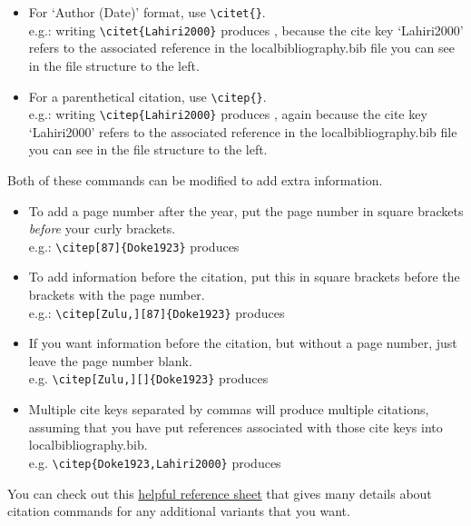 \documentclass[output=paper,colorlinks,citecolor=brown,
]{langscibook}
\begin{document}
 \begin{itemize}
 
 \item For `Author (Date)' format, use \verb|\citet{}|. \\
  e.g.: writing \verb|\citet{Lahiri2000}| produces \citet{Lahiri2000}, because the cite key `Lahiri2000' refers to the associated reference in the localbibliography.bib file you can see in the file structure to the left.
 \item For a parenthetical citation, use \verb|\citep{}|.\\
 e.g.: writing \verb|\citep{Lahiri2000}| produces \citep{Lahiri2000}, again because the cite key `Lahiri2000' refers to the associated reference in the localbibliography.bib file you can see in the file structure to the left.
 
 \end{itemize}

\noindent Both of these commands can be modified to add extra information.
 
 \begin{itemize}
 \item To add a page number after the year, put the page number in square brackets \textit{before} your curly brackets.\\
 e.g.: \verb|\citep[87]{Doke1923}| produces \citep[87]{Doke1923} 
 \item To add information before the citation, put this in square brackets before the brackets with the page number.\\
  e.g.: \verb|\citep[Zulu,][87]{Doke1923}| produces \citep[Zulu,][87]{Doke1923} 
  \item If you want information before the citation, but without a page number, just leave the page number blank.\\ 
  e.g. \verb|\citep[Zulu,][]{Doke1923}| produces \citep[Zulu,][]{Doke1923}
  \item Multiple cite keys separated by commas will produce multiple citations, assuming that you have put references associated with those cite keys into localbibliography.bib.\\
  e.g. \verb|\citep{Doke1923,Lahiri2000}| produces \citep{Doke1923,Lahiri2000}

 \end{itemize}
 

\noindent You can check out this \href{http://merkel.texture.rocks/Latex/natbib.php}{helpful reference sheet} that gives many details about citation commands for any additional variants that you want. %
\end{document}
